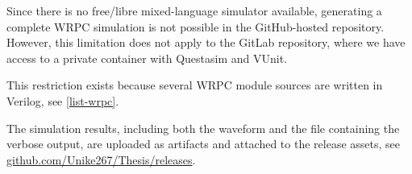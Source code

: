 \vspace{5mm}

\noindent Since there is no free/libre mixed-language simulator available, generating a complete WRPC simulation is not possible in the GitHub-hosted repository. However, this limitation does not apply to the GitLab repository, where we have access to a private container with Questasim and VUnit.

\vspace{5mm}

\noindent This restriction exists because several WRPC module sources are written in Verilog, see \ref{list-wrpc}.

\vspace{5mm}

\noindent The simulation results, including both the waveform and the  file containing the verbose output, are uploaded as artifacts and attached to the release assets, see \href{https://github.com/Unike267/Thesis/releases}{github.com/Unike267/Thesis/releases}.
